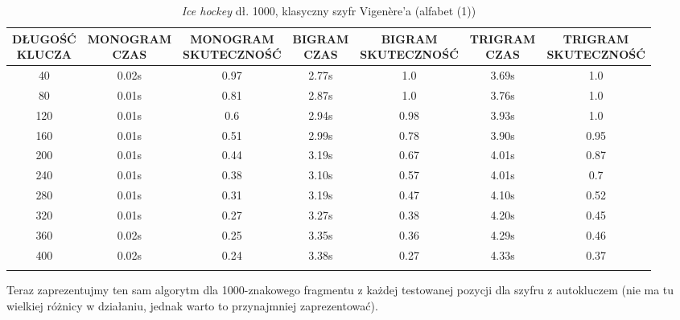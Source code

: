 \documentclass[a4paper]{article}
\theoremstyle{defn}
\theoremstyle{theorem}
\theoremstyle{lemma}
\theoremstyle{cor}
\theoremstyle{fact}
\begin{document}
\begin{center}\begin{small}\begin{longtable}{|c|c|c|c|c|c|c|} 
\hline \makecell{DŁUGOŚĆ\\KLUCZA} &  \makecell{MONOGRAM\\CZAS} & \makecell{MONOGRAM\\SKUTECZNOŚĆ} & \makecell{BIGRAM\\CZAS} &  \makecell{BIGRAM\\SKUTECZNOŚĆ} & \makecell{TRIGRAM\\CZAS} & \makecell{TRIGRAM\\SKUTECZNOŚĆ}\\ \hline 
40 & 0.02s & 0.97 & 2.77s & 1.0 & 3.69s & 1.0 \\ \hline 
80 & 0.01s & 0.81 & 2.87s & 1.0 & 3.76s & 1.0 \\ \hline 
120 & 0.01s & 0.6 & 2.94s & 0.98 & 3.93s & 1.0 \\ \hline 
160 & 0.01s & 0.51 & 2.99s & 0.78 & 3.90s & 0.95 \\ \hline 
200 & 0.01s & 0.44 & 3.19s & 0.67 & 4.01s & 0.87 \\ \hline 
240 & 0.01s & 0.38 & 3.10s & 0.57 & 4.01s & 0.7 \\ \hline 
280 & 0.01s & 0.31 & 3.19s & 0.47 & 4.10s & 0.52 \\ \hline 
320 & 0.01s & 0.27 & 3.27s & 0.38 & 4.20s & 0.45 \\ \hline 
360 & 0.02s & 0.25 & 3.35s & 0.36 & 4.29s & 0.46 \\ \hline 
400 & 0.02s & 0.24 & 3.38s & 0.27 & 4.33s & 0.37 \\ \hline 
\caption{\textit{Ice hockey} dł. 1000, klasyczny szyfr Vigenère'a (alfabet (1))}
\end{longtable}\end{small}\end{center} 
Teraz zaprezentujmy ten sam algorytm dla 1000-znakowego fragmentu z każdej testowanej pozycji dla szyfru z autokluczem (nie ma tu wielkiej różnicy w działaniu, jednak warto to przynajmniej zaprezentować).\\\\
\end{document}
